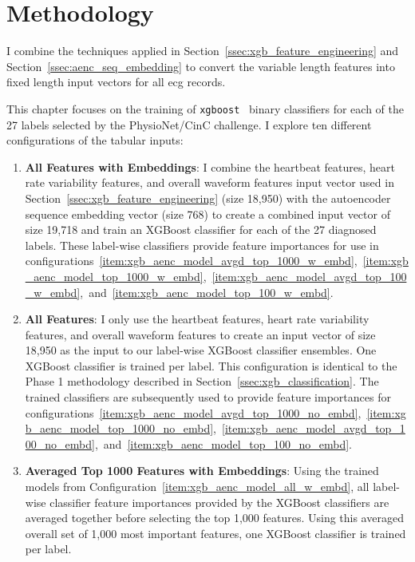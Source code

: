\documentclass[\main/thesis.tex]{subfiles}
\begin{document}
\section{Methodology}
\label{sec:aencxgb_methodology}

I combine the techniques applied in Section~\ref{ssec:xgb_feature_engineering} and Section~\ref{ssec:aenc_seq_embedding} to convert the variable length features into fixed length input vectors for all \gls{ecg} records.

This chapter focuses on the training of \texttt{xgboost}~\cite{chen_xgboost_2016} binary classifiers for each of the 27 labels selected by the PhysioNet/CinC challenge.
I explore ten different configurations of the tabular inputs:
\begin{enumerate}
    \item \label{item:xgb_aenc_model_all_w_embd} \textbf{All Features with Embeddings}: I combine the heartbeat features, heart rate variability features, and overall waveform features input vector used in Section~\ref{ssec:xgb_feature_engineering} (size 18,950) with the autoencoder sequence embedding vector (size 768) to create a combined input vector of size 19,718 and train an XGBoost classifier for each of the 27 diagnosed labels.
    These label-wise classifiers provide feature importances for use in configurations~\ref{item:xgb_aenc_model_avgd_top_1000_w_embd},~\ref{item:xgb_aenc_model_top_1000_w_embd},~\ref{item:xgb_aenc_model_avgd_top_100_w_embd},~and~\ref{item:xgb_aenc_model_top_100_w_embd}.
    \item \label{item:xgb_aenc_model_all_no_embd} \textbf{All Features}: I only use the heartbeat features, heart rate variability features, and overall waveform features to create an input vector of size 18,950 as the input to our label-wise XGBoost classifier ensembles. One XGBoost classifier is trained per label. This configuration is identical to the Phase 1 methodology described in Section~\ref{ssec:xgb_classification}.
    The trained classifiers are subsequently used to provide feature importances for configurations~\ref{item:xgb_aenc_model_avgd_top_1000_no_embd},~\ref{item:xgb_aenc_model_top_1000_no_embd},~\ref{item:xgb_aenc_model_avgd_top_100_no_embd},~and~\ref{item:xgb_aenc_model_top_100_no_embd}.
    \item \label{item:xgb_aenc_model_avgd_top_1000_w_embd} \textbf{Averaged Top 1000 Features with Embeddings}: Using the trained models from Configuration~\ref{item:xgb_aenc_model_all_w_embd}, all label-wise classifier feature importances provided by the XGBoost classifiers are averaged together before selecting the top 1,000 features. Using this averaged overall set of 1,000 most important features, one XGBoost classifier is trained per label.

\end{enumerate}
\end{document}
